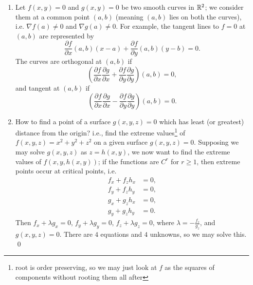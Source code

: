 \begin{enumerate}[label=(\alph*)]
    \item Let $f(x, y) = 0$ and $g(x, y) = 0$ be two smooth curves in $\mathbb R^2$; we consider them at a common point $(a, b)$ (meaning $(a, b)$ lies on both the curves), i.e. $\nabla f(a) \neq 0$ and $\nabla g(a) \neq 0$. For example, the tangent lines to $f = 0$ at $(a, b)$ are represented by
    \[ \frac{\partial f}{\partial x}(a, b)(x - a) + \frac{\partial f}{\partial y}(a, b)(y - b) = 0. \]
    The curves are orthogonal at $(a, b)$ if
    \[ \left( \frac{\partial f}{\partial x} \frac{\partial g}{\partial x} + \frac{\partial f}{\partial y} \frac{\partial g}{\partial y} \right)(a, b) = 0, \]
    and tangent at $(a, b)$ if
    \[ \left( \frac{\partial f}{\partial x} \frac{\partial g}{\partial x} - \frac{\partial f}{\partial y} \frac{\partial g}{\partial y} \right)(a, b) = 0. \]
    \item How to find a point of a surface $g(x, y, z) = 0$ which has least (or greatest) distance from the origin? i.e., find the extreme values\footnote{root is order preserving, so we may just look at $f$ as the squares of components without rooting them all after} of $f(x, y, z) = x^2 + y^2 + z^2$ on a given surface $g(x, y, z) = 0$. Supposing we may solve $g(x, y, z)$ as $z = h(x, y)$, we now want to find the extreme values of $f(x, y, h(x, y))$; if the functions are $C^r$ for $r \geq 1$, then extreme points occur at critical points, i.e.
    \begin{align*}
        f_x + f_zh_x &= 0, \\ 
        f_y + f_zh_y &= 0, \\
        g_x + g_zh_x &= 0, \\
        g_y + g_zh_y &= 0.
    \end{align*}
    Then $f_x + \lambda g_x = 0$, $f_y + \lambda g_y = 0$, $f_z + \lambda g_z = 0$, where $\lambda = -\frac{f_z}{g_z}$, and $g(x, y, z) = 0$. There are $4$ equations and $4$ unknowns, so we may solve this. \qed
\end{enumerate}